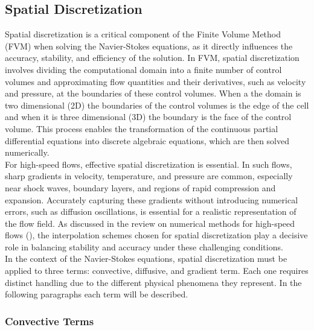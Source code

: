 \documentclass[a5paper]{sapthesis}
\begin{document}
	\subsection{Spatial Discretization}
	Spatial discretization is a critical component of the Finite Volume Method (FVM) when solving the Navier-Stokes equations, as it directly influences the accuracy, stability, and efficiency of the solution. In FVM, spatial discretization involves dividing the computational domain into a finite number of control volumes and approximating flow quantities and their derivatives, such as velocity and pressure, at the boundaries of these control volumes. When a the domain is two dimensional (2D) the boundaries of the control volumes is the edge of the cell and when it is three dimensional (3D) the boundary is the face of the control volume. This process enables the transformation of the continuous partial differential equations into discrete algebraic equations, which are then solved numerically.
	\\
	For high-speed flows, effective spatial discretization is essential. In such flows, sharp gradients in velocity, temperature, and pressure are common, especially near shock waves, boundary layers, and regions of rapid compression and expansion. Accurately capturing these gradients without introducing numerical errors, such as diffusion oscillations, is essential for a realistic representation of the flow field. As discussed in the review on numerical methods for high-speed flows (\citet{Pirozzoli2011}), the interpolation schemes chosen for spatial discretization play a decisive role in balancing stability and accuracy under these challenging conditions.
	\\
	In the context of the Navier-Stokes equations, spatial discretization must be applied to three terms: convective, diffusive, and gradient term. Each one requires distinct handling due to the different physical phenomena they represent. In the following paragraphs each term will be described.
	
	\subsubsection{Convective Terms}
	
\end{document}
